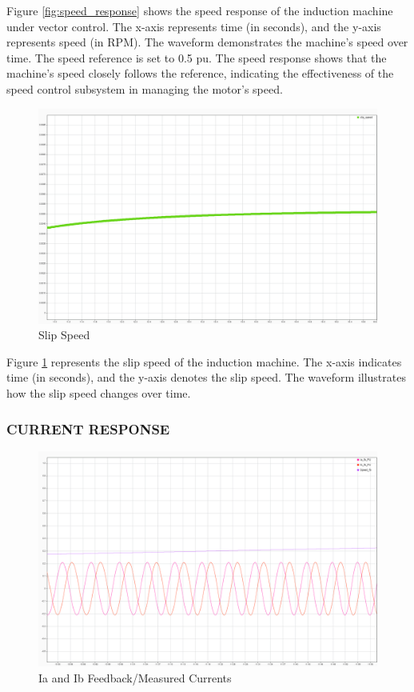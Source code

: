 Figure \ref{fig:speed_response} shows the speed response of the induction machine under vector control. The x-axis represents time (in seconds), and the y-axis represents speed (in RPM). The waveform demonstrates the machine's speed over time. The speed reference is set to 0.5 pu. The speed response shows that the machine's speed closely follows the reference, indicating the effectiveness of the speed control subsystem in managing the motor's speed.



\begin{figure}[H]
	\centering
	\includegraphics[width=6in]{sections/section3/images/simulationResutls/SlipSpeed.png}
	\caption{Slip Speed}
	\label{fig:slip_speed}
\end{figure}

Figure \ref{fig:slip_speed} represents the slip speed of the induction machine. The x-axis indicates time (in seconds), and the y-axis denotes the slip speed. The waveform illustrates how the slip speed changes over time. 


\subsubsection{CURRENT RESPONSE}


\begin{figure}[H]
	\centering
	\includegraphics[width=6in]{sections/section3/images/simulationResutls/Ia_Ib_fb.png}
	\caption{Ia and Ib Feedback/Measured Currents}
	\label{fig:current_response_IA_IB}
\end{figure}

